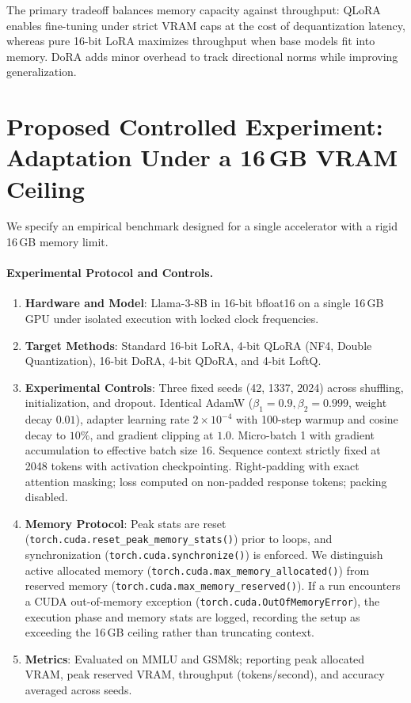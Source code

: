 \documentclass[11pt,a4paper]{article}
\begin{document}
The primary tradeoff balances memory capacity against throughput: QLoRA enables fine-tuning under strict VRAM caps at the cost of dequantization latency, whereas pure 16-bit LoRA maximizes throughput when base models fit into memory. DoRA adds minor overhead to track directional norms while improving generalization.

\section{Proposed Controlled Experiment: Adaptation Under a 16\,GB VRAM Ceiling}

We specify an empirical benchmark designed for a single accelerator with a rigid 16\,GB memory limit.

\paragraph{Experimental Protocol and Controls.}
\begin{enumerate}
    \item \textbf{Hardware and Model}: Llama-3-8B in 16-bit bfloat16 on a single 16\,GB GPU under isolated execution with locked clock frequencies.
    \item \textbf{Target Methods}: Standard 16-bit LoRA, 4-bit QLoRA (NF4, Double Quantization), 16-bit DoRA, 4-bit QDoRA, and 4-bit LoftQ.
    \item \textbf{Experimental Controls}: Three fixed seeds (42, 1337, 2024) across shuffling, initialization, and dropout. Identical AdamW ($\beta_1=0.9, \beta_2=0.999$, weight decay $0.01$), adapter learning rate $2\times 10^{-4}$ with 100-step warmup and cosine decay to $10\%$, and gradient clipping at $1.0$. Micro-batch 1 with gradient accumulation to effective batch size 16. Sequence context strictly fixed at 2048 tokens with activation checkpointing. Right-padding with exact attention masking; loss computed on non-padded response tokens; packing disabled.
    \item \textbf{Memory Protocol}: Peak stats are reset (\texttt{torch.cuda.reset\_peak\_memory\_stats()}) prior to loops, and synchronization (\texttt{torch.cuda.synchronize()}) is enforced. We distinguish active allocated memory (\texttt{torch.cuda.max\_memory\_allocated()}) from reserved memory (\texttt{torch.cuda.max\_memory\_reserved()}). If a run encounters a CUDA out-of-memory exception (\texttt{torch.cuda.OutOfMemoryError}), the execution phase and memory stats are logged, recording the setup as exceeding the 16\,GB ceiling rather than truncating context.
    \item \textbf{Metrics}: Evaluated on MMLU and GSM8k; reporting peak allocated VRAM, peak reserved VRAM, throughput (tokens/second), and accuracy averaged across seeds.
\end{enumerate}
\end{document}
